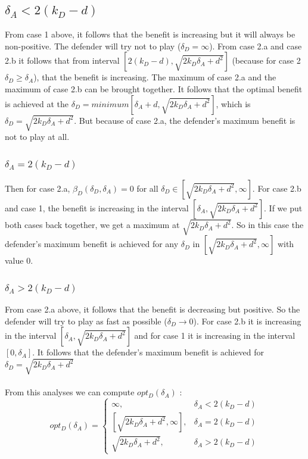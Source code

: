 \subsection*{$\delta_{A} < 2(k_{D} - d)$}
From case 1 above, it follows that the benefit is increasing but it will always be non-positive. The defender will try not to play ($\delta_{D}= \infty$). From case 2.a and case 2.b it follows that from interval $[2(k_{D} -d), \sqrt{2k_{D}\delta_{A} + d^{2}}]$  (because for case 2 $\delta_{D} \geq \delta_{A}$), that the benefit is increasing.  The maximum of case 2.a and the maximum of case 2.b can be brought together. It follows that the optimal benefit is achieved at the $\delta_{D}=minimum[\delta_{A} + d, \sqrt{2k_{D}\delta_{A} + d^{2}}]$, which is $\delta_{D}=\sqrt{2k_{D}\delta_{A} + d^{2}}$. But because of case 2.a, the defender's maximum benefit is not to play at all.

\subsubsection{$\delta_{A} = 2(k_{D} - d)$}
Then for case 2.a, $\beta_{D}(\delta_{D}, \delta_{A})=0$ for  all $\delta_{D} \in [\sqrt{2k_{D}\delta_{A} + d^{2}}, \infty]$. For case 2.b and case 1, the benefit is increasing in the interval $[\delta_{A},\sqrt{2k_{D}\delta_{A} + d^{2}}]$. If we put both cases back together, we get a maximum at $\sqrt{2k_{D}\delta_{A} + d^{2}}$. So in this case the defender's maximum benefit is achieved for any $\delta_{D}$ in $[\sqrt{2k_{D}\delta_{A} + d^{2}}, \infty]$ with value 0.

\subsubsection{$\delta_{A} > 2(k_{D} - d)$ }
From case 2.a above, it follows that the benefit is decreasing but positive. So the defender will try to play as fast as possible ($\delta_{D} \rightarrow 0$). For case 2.b it is increasing in the interval $[ \delta_{A} ,\sqrt{2k_{D}\delta_{A} + d^{2}}]$ and for case 1 it is increasing in the interval $[0,\delta_{A}]$. It follows that the defender's maximum benefit is achieved for $\delta_{D} = \sqrt{2k_{D}\delta_{A} + d^{2}} $  \\


~~\\
From this analyses we can compute $opt_{D}(\delta_{A})$ : \\

 \begin{displaymath}
  opt_{D}(\delta_{A}) = \left\{
     \begin{array}{lr}
          \infty , & \delta_{A} < 2(k_{D} - d)\\
      \left[ \sqrt{2k_{D}\delta_{A} + d^{2}},\infty\right] , & \delta_{A} = 2(k_{D} - d) \\
      \sqrt{2k_{D}\delta_{A} + d^{2}}, & \delta_{A} > 2(k_{D} - d)
     \end{array}
   \right.
\end{displaymath}




